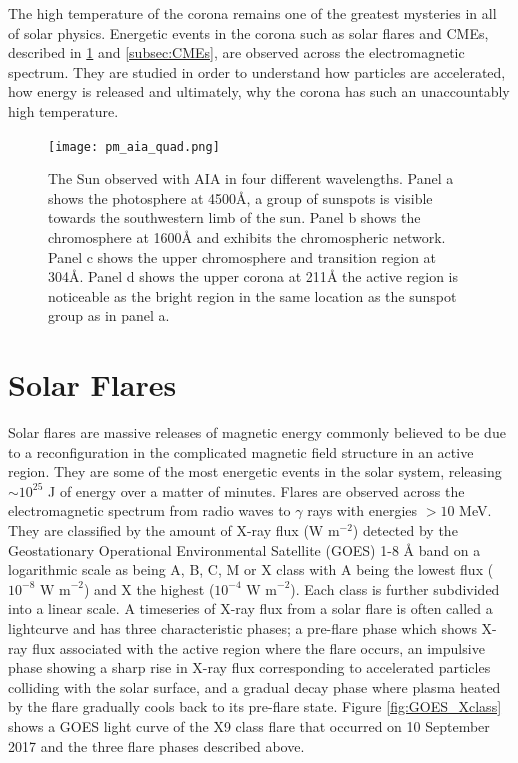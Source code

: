 The high temperature of the corona remains one of the greatest mysteries in all of solar physics. Energetic events in the corona such as solar flares and CMEs, described in \ref{subsec:sf} and \ref{subsec:CMEs}, are observed across the electromagnetic spectrum. They are studied in order to understand how particles are accelerated, how energy is released and ultimately, why the corona has such an unaccountably high temperature.

\begin{figure}[ht]
\centering
\texttt{[image: pm\_aia\_quad.png]}
\caption[The solar atmosphere at different wavelengths.]{The Sun observed with AIA in four different wavelengths. Panel a shows the photosphere at 4500{\AA}, a group of sunspots is visible towards the southwestern limb of the sun. Panel b shows the chromosphere at 1600{\AA} and exhibits the chromospheric network. Panel c shows the upper chromosphere and transition region at 304{\AA}. Panel d shows the upper corona at 211{\AA} the active region is noticeable as the bright region in the same location as the sunspot group as in panel a.}
\label{fig:aia_quad}
\end{figure}

\section{Solar Flares}
\label{subsec:sf}
Solar flares are massive releases of magnetic energy commonly believed to be due to a reconfiguration in the complicated magnetic field structure in an active region.  They are some of the most energetic events in the solar system, releasing $\sim 10^{25}$ J of energy over a matter of minutes. Flares are observed across the electromagnetic spectrum from radio waves to $\gamma$ rays with energies $> 10$ MeV. They are classified by the amount of X-ray flux (W m$^{-2}$) detected by the Geostationary Operational Environmental Satellite (GOES) 1-8 {\AA} band on a logarithmic scale as being A, B, C, M or X class with A being the lowest flux ($10^{-8} \mbox{ W m}^{-2}$) and X the highest ($10^{-4} \mbox{ W m}^{-2}$). Each class is further subdivided into a linear scale.
A timeseries of X-ray flux from a solar flare is often called a lightcurve and has three characteristic phases; a pre-flare phase which shows X-ray flux associated with the active region where the flare occurs, an impulsive phase showing a sharp rise in X-ray flux corresponding to accelerated particles colliding with the solar surface, and a gradual decay phase where plasma heated by the flare gradually cools back to its pre-flare state. Figure \ref{fig:GOES_Xclass} shows a GOES light curve of the X9 class flare that occurred on 10 September 2017 and the three flare phases described above.

